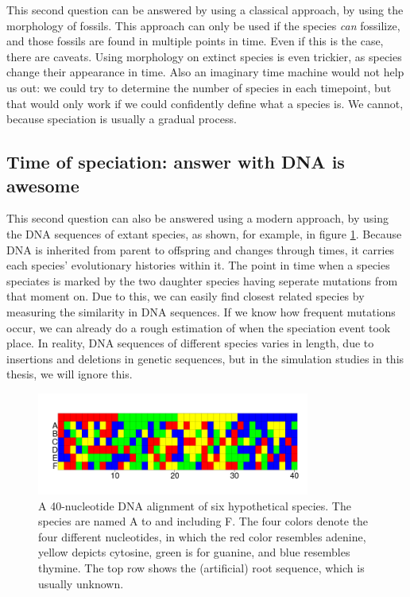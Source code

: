 This second question can be answered by
using a classical approach, 
by using the morphology of fossils.
This approach can only be used if the species \emph{can} fossilize,
and those fossils are found in multiple points in time.
Even if this is the case, there are caveats. Using morphology on
extinct species is even trickier, as species change their appearance in time.
Also an imaginary time machine would not help us out:
we could try to determine the number of species in each timepoint,
but that would only work if we could confidently define what a
species is. We cannot, because speciation is usually a gradual process.

\subsection{Time of speciation: answer with DNA is awesome}

This second question can also be answered 
using a modern approach, 
by using the DNA sequences of extant species,
as shown, for example, in figure \ref{fig:alignment}.
Because DNA is inherited from parent to offspring
and changes through times, it carries each species' 
evolutionary histories within it.
The point in time when a species speciates is
marked by the two daughter species having seperate mutations
from that moment on.
Due to this, we can easily find closest related species 
by measuring the similarity in DNA sequences.
If we know how frequent mutations occur, we can already
do a rough estimation of when the speciation event took place.
In reality, DNA sequences of different species 
varies in length, due to insertions and deletions in genetic sequences,
but in the simulation studies in this thesis, we will ignore this.

\begin{figure}[H]
  \includegraphics[width=0.8\textwidth]{alignment_40_with_root.png}
  \caption{
    A 40-nucleotide DNA alignment of six hypothetical species. The species
    are named A to and including F. 
    The four colors denote the four different nucleotides,
    in which the red color resembles adenine, yellow depicts cytosine, 
    green is for guanine, and blue resembles thymine. The top
    row shows the (artificial) root sequence, which is usually unknown.
  }
  \label{fig:alignment}
\end{figure}

